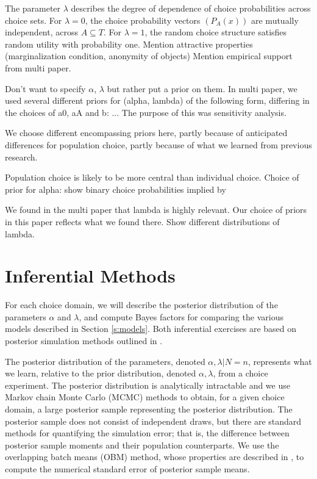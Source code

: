 \documentclass[11pt,letter]{article}
\begin{document}
The parameter $\lambda$ describes the degree of dependence of choice probabilities across choice sets.
For $\lambda = 0$, the choice probability vectors $(P_A(x))$ are mutually independent, across $A \subseteq T$.
For $\lambda = 1$, the random choice structure satisfies random utility with probability one.
Mention attractive properties (marginalization condition, anonymity of objects)
Mention empirical support from multi paper.

Don't want to specify $\alpha$, $\lambda$ but rather put a prior on them.
In multi paper, we used several different priors for (alpha, lambda) of the following form, differing in the choices of a0, aA and b: ...
The purpose of this was sensitivity analysis.

We choose different encompassing priors here, partly because of anticipated differences for population choice, partly because of what we learned from previous research.

Population choice is likely to be more central than individual choice.
Choice of prior for alpha: show binary choice probabilities implied by 

We found in the multi paper that lambda is highly relevant.
Our choice of priors in this paper reflects what we found there.
Show different distributions of lambda.







\section{Inferential Methods}\label{s:inference}

For each choice domain, we will describe the posterior distribution of the parameters $\alpha$ and $\lambda$, and compute Bayes factors for comparing the various models described in Section \ref{s:models}.
Both inferential exercises are based on posterior simulation methods outlined in .

The posterior distribution of the parameters, denoted $\alpha,\lambda|N=n$, represents what we learn, relative to the prior distribution, denoted $\alpha,\lambda$, from a choice experiment.
The posterior distribution is analytically intractable and we use Markov chain Monte Carlo (MCMC) methods to obtain, for a given choice domain, a large posterior sample representing the posterior distribution.
The posterior sample does not consist of independent draws, but there are standard methods for quantifying the simulation error; that is, the difference between posterior sample moments and their population counterparts.
We use the overlapping batch means (OBM) method, whose properties are described in , to compute the numerical standard error of posterior sample means.
\end{document}
